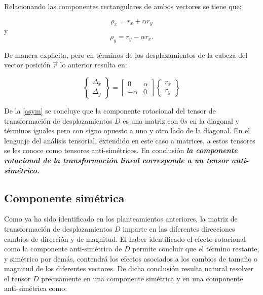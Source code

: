 \documentclass[../notas medios.tex]{subfiles}
\begin{document}
Relacionando las componentes rectangulares de ambos vectores se tiene que:

\[{\rho _x} = {r_x} + \alpha {r_y}\]
y
\[{\rho _y} = {r_y} - \alpha {r_x}.\]

De manera explicita, pero en términos de los desplazamientos de la cabeza del vector posición $\vec{r}$ lo anterior resulta en:

\begin{equation}
\left\{ {\begin{array}{*{20}{c}}
{{\Delta _x}}\\
{{\Delta _y}}
\end{array}} \right\} = \left[ {\begin{array}{*{20}{c}}
0&\alpha \\
{ - \alpha }&0
\end{array}} \right]\left\{ {\begin{array}{*{20}{c}}
{{r_x}}\\
{{r_y}}
\end{array}} \right\}
\label{asym}
\end{equation}

De la \cref{asym} se concluye que la componente rotacional del tensor de transformación de desplazamientos $D$ es una matriz con $0s$ en la diagonal y términos iguales pero con signo opuesto a uno y otro lado de la diagonal. En el lenguaje del análisis tensorial, extendido en este caso a matrices, a estos tensores se les conoce como tensores anti-simétricos. En conclusión \textbf{\textit{la componente rotacional de la transformación lineal corresponde a un tensor anti-simétrico.}}


\subsection{Componente simétrica}
Como ya ha sido identificado en los planteamientos anteriores, la matriz de transformación de desplazamientos $D$ imparte en las diferentes direcciones cambios de dirección y de magnitud. El haber identificado el efecto rotacional como la componente anti-simétrica de $D$ permite concluir que el término restante, y simétrico por demás, contendrá los efectos asociados a los cambios de tamaño o magnitud de los diferentes vectores. De dicha conclusión resulta natural resolver el tensor $D$ precisamente en una componente simétrica y en una componente anti-simétrica como:
\end{document}
